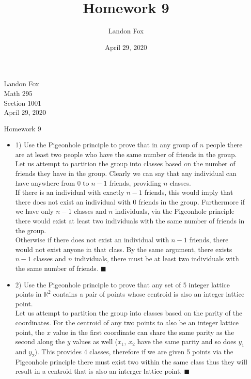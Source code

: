 \documentclass[ 12pt ]{article}
\begin{document}
\title{Homework 9}
\author{Landon Fox}
\date{April 29, 2020}

\begin{flushleft}
Landon Fox \\
Math 295 \\
Section 1001 \\
April 29, 2020
\end{flushleft}
\begin{center}
\Large Homework 9
\end{center}

\begin{itemize}
	\item[] {\large 1)}
	Use the Pigeonhole principle to prove that in any group of $n$ people there are
	at least two people who have the same number of friends in the group. \\
	Let us attempt to partition the group into classes based on the number
	of friends they have in the group. Clearly we can say that any individual
	can have anywhere from 0 to $n-1$ friends, providing $n$ classes. \\
	If there is an individual with exactly $n-1$ friends, this would
	imply that there does not exist an individual
	with 0 friends in the group. Furthermore if we have only $n-1$ classes
	and $n$ individuals, via the Pigeonhole principle there would exist at least
	two individuals with the same number of friends in the group. \\
	Otherwise if there does not exist an individual with $n-1$ friends, there would
	not exist anyone in that class. By the same argument, there exists
	$n-1$ classes and $n$ individuals, there must be at least two individuals with
	the same number of friends. $\blacksquare$

	\item[] {\large 2)}
	Use the Pigeonhole principle to prove that any set of 5 integer lattice points
	in $\mathbb{R}^2$ contains a pair of points whose centroid is
	also an integer lattice point. \\
	Let us attempt to partition the group into classes based on the parity
	of the coordinates. For the centroid of any two points to also be an
	integer lattice point, the $x$ value in the first coordinate can share the
	same parity as the second along the $y$ values as well ($x_1$, $x_2$ have the
	same parity and so does $y_1$ and $y_2$). This provides 4 classes, therefore
	if we are given 5 points via the Pigeonhole principle there must exist two within
	the same class thus they will result in a centroid that is also an interger lattice
	point. $\blacksquare$


\end{itemize}
\end{document}
